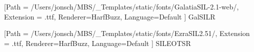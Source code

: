 \usepackage{fontspec}
\usepackage[bidi=basic]{babel}





           [Path = /Users/jonsch/MBS/_Templates/static/fonts/GalatiaSIL-2.1-web/,
           Extension = .ttf,
           Renderer=HarfBuzz,
           Language=Default ]
          {GalSILR}

           [Path = /Users/jonsch/MBS/_Templates/static/fonts/EzraSIL2.51/,
           Extension = .ttf,
           Renderer=HarfBuzz,
           Language=Default ]
          {SILEOTSR}
